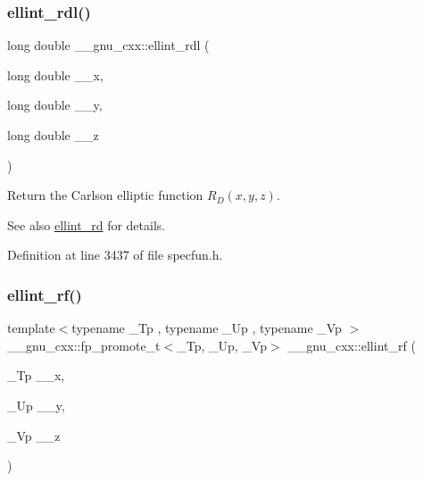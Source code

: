 \subsubsection{\texorpdfstring{ellint\+\_\+rdl()}{ellint\_rdl()}}
{\footnotesize\ttfamily long double \+\_\+\+\_\+gnu\+\_\+cxx\+::ellint\+\_\+rdl (\begin{DoxyParamCaption}\item[{long double}]{\+\_\+\+\_\+x,  }\item[{long double}]{\+\_\+\+\_\+y,  }\item[{long double}]{\+\_\+\+\_\+z }\end{DoxyParamCaption})\hspace{0.3cm}{\ttfamily [inline]}}

Return the Carlson elliptic function $ R_D(x,y,z) $.

\begin{DoxySeeAlso}{See also}
\hyperlink{group__mathsf__gnu_gad29dae6abc783c8fe952dba477e65309}{ellint\+\_\+rd} for details. 
\end{DoxySeeAlso}


Definition at line 3437 of file specfun.\+h.

\mbox{\label{group__mathsf__gnu_gae4859494464c7eaf98193f92b2235bc1}} 
\subsubsection{\texorpdfstring{ellint\+\_\+rf()}{ellint\_rf()}}
{\footnotesize\ttfamily template$<$typename \+\_\+\+Tp , typename \+\_\+\+Up , typename \+\_\+\+Vp $>$ \\
\+\_\+\+\_\+gnu\+\_\+cxx\+::fp\+\_\+promote\+\_\+t$<$\+\_\+\+Tp, \+\_\+\+Up, \+\_\+\+Vp$>$ \+\_\+\+\_\+gnu\+\_\+cxx\+::ellint\+\_\+rf (\begin{DoxyParamCaption}\item[{\+\_\+\+Tp}]{\+\_\+\+\_\+x,  }\item[{\+\_\+\+Up}]{\+\_\+\+\_\+y,  }\item[{\+\_\+\+Vp}]{\+\_\+\+\_\+z }\end{DoxyParamCaption})\hspace{0.3cm}{\ttfamily [inline]}}

